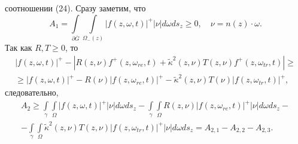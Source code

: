 \documentclass[12pt,reqno]{report}
\begin{document}
соотношении (24). Сразу заметим, что
\begin{equation}
A_1 = \int \limits_{\partial \overline{G}} \int
\limits_{\Omega_-(z)}
|f(z,\omega,t)|^+ |\nu | d \omega d
s_z \geq 0, \quad \nu = n(z)\cdot \omega.
\end{equation}
Так как $R, T \geq 0$, то
\begin{multline}
|f(z,\omega,t)|^+ - |R(z,\nu ) f^+(z,\omega_{re},t) +
\widetilde{\kappa}^2(z,\nu )T(z,\nu ) f^+(z,\omega_{tr},t) | \geq \\
\geq | f (z,\omega,t)|^+ - R(\nu ) |f(z,\omega_{re},t)|^+ -
\widetilde{\kappa}^2(z,\nu )T(\nu ) |f(z,\omega_{tr},t) |^+,
\end{multline}
следовательно,
\begin{multline}
A_2 \geq \int \limits_{\gamma} \int \limits_{\Omega}| f
(z,\omega,t)|^+|\nu | d\omega d s_z -   \int \limits_{\gamma} \int \limits_{\Omega}  R(z,\nu ) |f(z,\omega_{re},t)|^+ |\nu |d\omega d s_z - \\- 
 \int \limits_{\gamma} \int \limits_{\Omega} \widetilde{\kappa}^2(z,\nu )T(z,\nu ) |f(z,\omega_{tr},t) |^+ 
|\nu |d\omega d s_z = A_{2,1}- A_{2,2} - A_{2,3}.
\end{multline}
\end{document}
